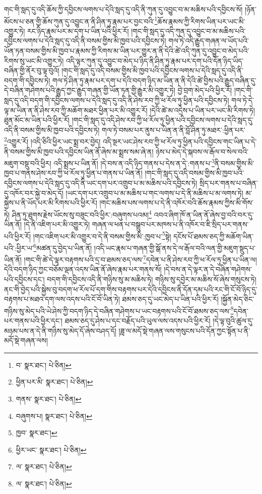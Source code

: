 གང་གི་སླད་དུ་འདི་ཆོས་ཀྱི་དབྱིངས་ལགས་པ་དེའི་སླད་དུ་འདི་ནི་ཀུན་དུ་འབྱུང་བ་མ་མཆིས་པའི་དབྱིངས་སོ། །ཉོན་མོངས་པ་ཅན་གྱི་ཆོས་ཀུན་དུ་འབྱུང་ན་ནི་ཤིན་ཏུ་རྣམ་པར་བྱང་བའི་\footnote{བ་  སྣར་ཐང་།  པེ་ཅིན། }ཆོས་རྣམས་ཀྱི་རིགས་ཡིན་པར་ཡང་མི་འགྱུར་ཏེ། རང་ཉིད་རྣམ་པར་མ་དག་པ་ཡིན་པའི་ཕྱིར་རོ། །གང་གི་སླད་དུ་འདི་ཀུན་དུ་འབྱུང་བ་མ་མཆིས་པའི་དབྱིངས་ལགས་པ་དེའི་སླད་དུ་འདི་ནི་བསམ་གྱིས་མི་ཁྱབ་པའི་དབྱིངས་ཏེ། གལ་ཏེ་འདི་རྒྱུད་གཞན་ལ་ཡོད་པའི་ཡོན་ཏན་བསམ་གྱིས་མི་ཁྱབ་པ་རྣམས་ཀྱི་རིགས་མ་ཡིན་པར་གྱུར་ན་ནི་དེའི་ཚེ་འདི་ཀུན་དུ་འབྱུང་བ་མེད་པའི་རིགས་སུ་ཡང་མི་འགྱུར་ཏེ། འདི་ལྟར་ཀུན་དུ་འབྱུང་བ་མེད་པ་ཉིད་ནི་ཤིན་ཏུ་རྣམ་པར་དག་པའི་དོན་ཉིད་ཡིད་བཞིན་གྱི་ནོར་བུ་ལྟ་བུའོ། །གང་གི་སླད་དུ་འདི་བསམ་གྱིས་མི་ཁྱབ་པའི་དབྱིངས་ལགས་པ་དེའི་སླད་དུ་འདི་ནི་བདག་གི་དབྱིངས་ཏེ། གལ་ཏེ་ཤིན་ཏུ་རྣམ་པར་དག་པ་དེའི་བདག་ཉིད་མ་ཡིན་ན་ནི་དེའི་ཚེ་བྱིས་པའི་རྒྱུད་བཞིན་དུ་དེ་བཞིན་གཤེགས་པའི་རྒྱུད་ཀྱང་རྒྱུད་གཞན་གྱི་ཡོན་ཏན་གྱི་རྒྱུར་མི་འགྱུར་ཏེ། བྱེ་བྲག་མེད་པའི་ཕྱིར་རོ། །གང་གི་སླད་དུ་འདི་བདག་གི་དབྱིངས་ལགས་པ་དེའི་སླད་དུ་འདི་ནི་ཤེས་རབ་ཀྱི་ཕ་རོལ་ཏུ་ཕྱིན་པའི་དབྱིངས་ཏེ། གལ་ཏེ་དེ་ལྟ་མ་ཡིན་ན་ནི་ཤེས་རབ་ཀྱི་མཆོག་མཐར་ཕྱིན་པར་མི་འགྱུར་རོ། །དེའི་ཚེ་མ་འདྲེས་པ་ཡིན་པར་ཡང་མི་རིགས་ཏེ། ཐུན་མོང་མ་ཡིན་པའི་ཕྱིར་རོ། །གང་གི་སླད་དུ་འདི་ཤེས་རབ་ཀྱི་ཕ་རོལ་ཏུ་ཕྱིན་པའི་དབྱིངས་ལགས་པ་དེའི་སླད་དུ་འདི་ནི་བསམ་གྱིས་མི་ཁྱབ་པའི་དབྱིངས་ཏེ། གལ་ཏེ་བསམ་པར་ནུས་པ་ཡིན་ན་ནི་བློ་ཤིན་ཏུ་མཐར་:ཕྱིན་པར་\footnote{ཕྱིན་པར་མི་  སྣར་ཐང་།  པེ་ཅིན། }འགྱུར་རོ། །འདི་ཅིའི་ཕྱིར་ཡང་སྨྲ་བར་བྱེད། འདི་སྔར་ཡང་ཤེས་རབ་ཀྱི་ཕ་རོལ་ཏུ་ཕྱིན་པའི་དབྱིངས་གང་ཡིན་པ་དེ་ནི་བསམ་གྱིས་མི་ཁྱབ་པའི་དབྱིངས་ཡིན་ནོ་ཞེས་མ་སྨྲས་སམ་ཞེ་ན། ཉེས་པ་མེད་དེ་སྐབས་ལ་རྒོལ་བ་སེལ་བའི་མཇུག་བསྡུ་བའི་ཕྱིར། འདི་སྨྲས་པ་ཡིན་ནོ། །དེ་བས་ན་འདི་ཉིད་གནས་པ་དེས་ན་དེ་:གནས་པ་\footnote{གནས་  སྣར་ཐང་།  པེ་ཅིན། }ནི་བསམ་གྱིས་མི་ཁྱབ་པ་གནས་ཤེས་རབ་ཀྱི་ཕ་རོལ་ཏུ་ཕྱིན་པ་གནས་པ་ཡིན་ནོ། །གང་གི་སླད་དུ་འདི་བསམ་གྱིས་མི་ཁྱབ་པའི་དབྱིངས་ལགས་པ་དེའི་སླད་དུ་འདི་ནི་ཡང་དག་པར་འགྲུབ་པ་མ་མཆིས་པའི་དབྱིངས་ཏེ། སྲིད་པར་གནས་པ་བཞིན་དུ་འཁོར་བར་སྐྱེ་བ་མེད་དོ། །ཡང་དག་པར་འགྲུབ་པ་མ་མཆིས་པ་གང་ལགས་པ་དེ་ནི་མཆིས་པ་མ་ལགས་ཏེ། མ་སྐྱེས་པ་ནི་ཡོད་པར་མི་རིགས་པའི་ཕྱིར་རོ། །གང་མཆིས་པས་ལགས་པ་དེ་ནི་འཁོར་བའི་ཆོས་རྣམས་ཀྱིས་མི་གོས་ཏེ། ཤིན་ཏུ་ཐུགས་རྗེས་ཡོངས་སུ་བཟུང་བའི་ཕྱིར་:བཞུགས་པའམ།\footnote{བཞུགས་པ།  སྣར་ཐང་།  པེ་ཅིན། } འབའ་ཞིག་ཁོ་ན་ཡིན་ནོ་ཞེས་བྱ་བའི་བར་དུ་ཡིན་ནོ། །དེ་ནི་འཇིག་པར་མི་འགྱུར་ཏེ། གཞན་ལ་ཕན་པ་བསྒྲུབ་པར་མཁས་པ་ནི་འཁོར་བ་ཇི་སྲིད་པར་གནས་པའི་ཕྱིར་རོ། །གང་འཇིག་པར་མི་འགྱུར་བ་དེ་ནི་བསམ་གྱིས་མི་:ཁྱབ་པ་\footnote{ཁྱབ་  སྣར་ཐང་། }སྟེ། དངོས་པོ་ཐམས་ཅད་ཀྱི་མཆོག་ཡིན་པའི་:ཕྱིར་ཡ་\footnote{ཕྱིར་ཡང་  སྣར་ཐང་།  པེ་ཅིན། }མཚན་དུ་བྱེད་པ་ཡིན་ནོ། །འདི་ཡང་རྣམ་པ་གཞན་གྱི་སྒོ་ནས་དེ་ལ་རྒོལ་བའི་ལན་གྱི་མཇུག་སྡུད་པ་ཡིན་ནོ། །གང་གི་ཚེ་དེ་ལྟར་བརྟགས་པའི་དྲ་བ་ཐམས་ཅད་ལས་\footnote{ལ་  སྣར་ཐང་།  པེ་ཅིན། }དབེན་པ་ནི་ཤེས་རབ་ཀྱི་ཕ་རོལ་ཏུ་ཕྱིན་པ་ཡིན་ལ། དེའི་བདག་ཉིད་ཀྱང་བཅོམ་ལྡན་འདས་ཡིན་ནོ་ཞེས་རྣམ་པར་གནས་སོ། །དེ་བས་ན་དེ་ལྟར་ན་དེ་བཞིན་གཤེགས་པའི་དབྱིངས་དང་། བདག་གི་དབྱིངས་འདི་ནི་གཉིས་སུ་མ་མཆིས་ཏེ། གཉིས་སུ་དབྱེར་མ་མཆིས་སོ་ཞེས་གསུངས་ཏེ། ནང་གི་བྱེད་པའི་སྐྱེས་བུ་བདག་ཕ་རོལ་པོ་དག་གིས་བརྟགས་པར་དེའི་དབྱིངས་ནི་དོན་དམ་པའི་རང་གི་ངོ་བོ་ཉིད་དུ་བརྟགས་པ་མཐའ་དག་ལས་འདས་པའི་ངོ་བོ་ཡིན་ཏེ། ཐམས་ཅད་དུ་ཡང་མེད་པ་ཡིན་པའི་ཕྱིར་རོ། །སྐྱོན་མེད་ཅིང་གཉིས་སུ་མེད་པའི་ཡེ་ཤེས་ཀྱི་བདག་ཉིད་དེ་བཞིན་གཤེགས་པ་ཡང་བརྟགས་པའི་ངོ་བོ་ཐམས་ཅད་ལས་\footnote{ལ་  སྣར་ཐང་།  པེ་ཅིན། }དབེན་པར་གནས་པའི་ཕྱིར་དང་། ཐམས་ཅད་དུ་ཤེས་པ་དང་བརྗོད་པའི་ཡུལ་ལས་འདས་པའི་ཕྱིར་རོ། །དེ་ལྟ་བུའི་ཚུལ་དུ་མཉམ་པས་ན་དེ་ནི་གཉིས་སུ་མེད་དོ་ཞེས་བཤད་དོ། །ཟླ་ལ་མདོ་སྡེ་གཞན་ལས་གསུངས་པའི་དོན་ཀྱང་སྟོན་པ་ནི་མདོ་སྡེ་གཞན་ལས། 